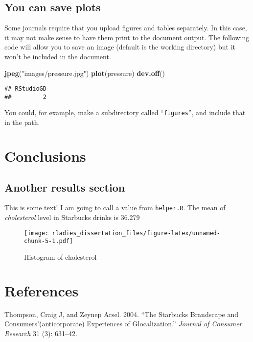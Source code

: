 \documentclass[
  12pt,
  oneside]{book}
\newenvironment{Shaded}{\begin{snugshade}}{\end{snugshade}}
\newcommand{\KeywordTok}[1]{\textcolor[rgb]{0.13,0.29,0.53}{\textbf{#1}}}
\newcommand{\NormalTok}[1]{#1}
\newcommand{\StringTok}[1]{\textcolor[rgb]{0.31,0.60,0.02}{#1}}
\numberwithin{figure}{chapter}
\begin{document}
\hypertarget{you-can-save-plots}{%
\section{You can save plots}\label{you-can-save-plots}}

Some journals require that you upload figures and tables separately. In this case, it may not make sense to have them print to the document output. The following code will allow you to save an image (default is the working directory) but it won't be included in the document.

\begin{Shaded}
\begin{Highlighting}[]
\KeywordTok{jpeg}\NormalTok{(}\StringTok{"images/pressure.jpg"}\NormalTok{)}
\KeywordTok{plot}\NormalTok{(pressure)}
\KeywordTok{dev.off}\NormalTok{()}
\end{Highlighting}
\end{Shaded}

\begin{verbatim}
## RStudioGD 
##         2
\end{verbatim}

You could, for example, make a subdirectory called ``\texttt{figures}'', and include that in the path.

\hypertarget{conclusions}{%
\chapter{Conclusions}\label{conclusions}}

\hypertarget{another-results-section}{%
\section{Another results section}\label{another-results-section}}

This is some text! I am going to call a value from \texttt{helper.R}. The mean of \emph{cholesterol} level in Starbucks drinks is 36.279

\begin{figure}
\centering
\texttt{[image: rladies\_dissertation\_files/figure-latex/unnamed-chunk-5-1.pdf]}
\caption{\label{fig:unnamed-chunk-5}Histogram of cholesterol}
\end{figure}

\hypertarget{references}{%
\chapter*{References}\label{references}}

\hypertarget{refs}{}
\leavevmode\hypertarget{ref-thompson2004}{}%
Thompson, Craig J, and Zeynep Arsel. 2004. ``The Starbucks Brandscape and Consumers'(anticorporate) Experiences of Glocalization.'' \emph{Journal of Consumer Research} 31 (3): 631--42.

\backmatter
\end{document}
